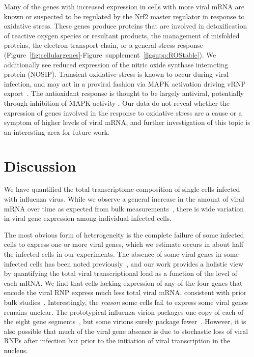 \documentclass[9pt,lineno]{elife}
\begin{document}
Many of the genes with increased expression in cells with more viral mRNA are known or suspected to be regulated by the Nrf2 master regulator in response to oxidative stress.
These genes produce proteins that are involved in detoxification of reactive oxygen species or resultant products, the management of misfolded proteins, the electron transport chain, or a general stress response (Figure~\ref{fig:cellulargenes}-Figure~supplement~\ref{figsupp:ROStable}). 
We additionally see reduced expression of the nitric oxide synthase interacting protein (NOSIP). 
Transient oxidative stress is known to occur during viral infection, and may act in a proviral fashion via MAPK activation driving vRNP export~\citep{Amatore:2014cs}.
The antioxidant response is thought to be largely antiviral, potentially through inhibition of MAPK activity \citep{Lin:2016ec,Sgarbanti:2014ht}.
Our data do not reveal whether the expression of genes involved in the response to oxidative stress are a cause or a symptom of higher levels of viral mRNA, and further investigation of this topic is an interesting area for future work.

\section{Discussion}
We have quantified the total transcriptome composition of single cells infected with influenza virus.
While we observe a general increase in the amount of viral mRNA over time as expected from bulk measurements~\citep{hatada1989control,Shapiro:1987ur}, there is wide variation in viral gene expression among individual infected cells.

The most obvious form of heterogeneity is the complete failure of some infected cells to express one or more viral genes, which we estimate occurs in about half the infected cells in our experiments.
The absence of some viral genes in some infected cells has been noted previously~\citep{Brooke:2013kb,Heldt:2015iz,Dou:2017cp}, and our work provides a holistic view by quantifying the total viral transcriptional load as a function of the level of each mRNA.
We find that cells lacking expression of any of the four genes that encode the viral RNP express much less total viral mRNA, consistent with prior bulk studies~\citep{Vreede:2004ip,eisfeld2015centre}.
Interestingly, the \emph{reason} some cells fail to express some viral genes remains unclear.
The prototypical influenza virion packages one copy of each of the eight gene segments~\citep{noda2006architecture,hutchinson2010genome}, but some virions surely package fewer~\citep{brooke2014influenza}.
However, it is also possible that much of the viral gene absence is due to stochastic loss of viral RNPs after infection but prior to the initiation of viral transcription in the nucleus.
\end{document}
